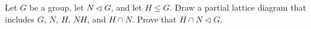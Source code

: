 \documentclass[12pt,letterpaper,boxed]{hmcpset}
\begin{document}
\begin{solution}
\end{solution}

\clearpage

\begin{problem}[10.2.5]
Let $G$ be a group, let $ N \triangleleft G $, and let $ H \leq G $. Draw a partial lattice diagram that includes $G$, $N$, $H$, $NH$, and $H \cap N$. Prove that $ H \cap N \triangleleft G $.
\end{problem}

\begin{solution}

\end{solution}
\end{document}
